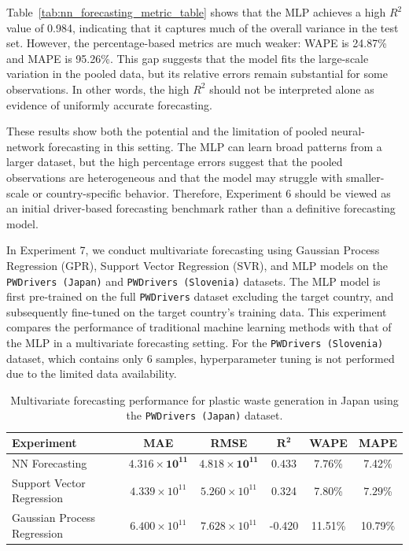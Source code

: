 Table~\ref{tab:nn_forecasting_metric_table} shows that the MLP achieves a high \(R^2\) value of 0.984, indicating that it captures much of the overall variance in the test set. However, the percentage-based metrics are much
weaker: WAPE is 24.87\% and MAPE is 95.26\%. This gap suggests that the model fits the large-scale variation in the pooled data, but its relative errors remain substantial for some observations. In other words, the high
\(R^2\) should not be interpreted alone as evidence of uniformly accurate forecasting.

These results show both the potential and the limitation of pooled neural-network forecasting in this setting. The MLP can learn broad patterns from a larger dataset, but the high percentage errors suggest that the pooled
observations are heterogeneous and that the model may struggle with smaller-scale or country-specific behavior. Therefore, Experiment 6 should be viewed as an initial driver-based forecasting benchmark rather than a
definitive forecasting model.


In Experiment 7, we conduct multivariate forecasting using Gaussian Process Regression (GPR), Support Vector Regression (SVR), and MLP models on the \texttt{PWDrivers (Japan)} and \texttt{PWDrivers (Slovenia)} datasets. The MLP model is first pre-trained on the full \texttt{PWDrivers} dataset excluding the target country, and subsequently fine-tuned on the target country's training data. This experiment compares the performance of traditional machine learning methods with that of the MLP in a multivariate forecasting setting. For the \texttt{PWDrivers (Slovenia)} dataset, which contains only \(6\) samples, hyperparameter tuning is not performed due to the limited data availability.

\begin{table}[!ht]
	\centering
	\caption{\centering Multivariate forecasting performance for plastic waste generation in Japan using the \texttt{PWDrivers (Japan)} dataset.}
	\begin{tabular}{@{}lccccc@{}}
		\toprule
		\textbf{Experiment}         & \textbf{MAE}                      & \textbf{RMSE}                     & $\mathbf{R^2}$     & \textbf{WAPE}       & \textbf{MAPE}       \\
		\midrule
		NN Forecasting              & \(\mathbf{4.316 \times 10^{11}}\) & \(\mathbf{4.818 \times 10^{11}}\) & \(\mathbf{0.433}\) & \(\mathbf{7.76}\)\% & 7.42\%              \\
		Support Vector Regression   & \(4.339 \times 10^{11}\)          & \(5.260 \times 10^{11}\)          & 0.324              & 7.80\%              & \(\mathbf{7.29}\)\% \\
		Gaussian Process Regression & \(6.400 \times 10^{11}\)          & \(7.628 \times 10^{11}\)          & -0.420             & 11.51\%             & 10.79\%             \\
		\hline
	\end{tabular}
	\label{tab:multivariate_forecasting_japan_metric_table}
\end{table}

